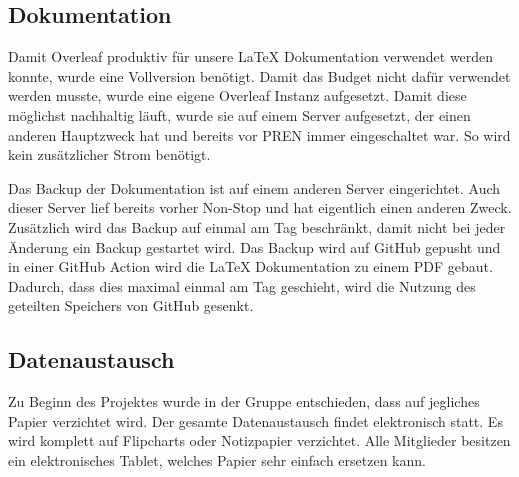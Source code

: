 

\subsection{Dokumentation}

Damit Overleaf produktiv für unsere LaTeX Dokumentation verwendet werden konnte, wurde eine Vollversion benötigt. Damit das Budget nicht dafür verwendet werden musste, wurde eine eigene Overleaf Instanz aufgesetzt. Damit diese möglichst nachhaltig läuft, wurde sie auf einem Server aufgesetzt, der einen anderen Hauptzweck hat und bereits vor PREN immer eingeschaltet war. So wird kein zusätzlicher Strom benötigt.

Das Backup der Dokumentation ist auf einem anderen Server eingerichtet. Auch dieser Server lief bereits vorher Non-Stop und hat eigentlich einen anderen Zweck. Zusätzlich wird das Backup auf einmal am Tag beschränkt, damit nicht bei jeder Änderung ein Backup gestartet wird. Das Backup wird auf GitHub gepusht und in einer GitHub Action wird die LaTeX Dokumentation zu einem PDF gebaut. Dadurch, dass dies maximal einmal am Tag geschieht, wird die Nutzung des geteilten Speichers von GitHub gesenkt.

\subsection{Datenaustausch}

Zu Beginn des Projektes wurde in der Gruppe entschieden, dass auf jegliches Papier verzichtet wird. Der gesamte Datenaustausch findet elektronisch statt. Es wird komplett auf Flipcharts oder Notizpapier verzichtet. Alle Mitglieder besitzen ein elektronisches Tablet, welches Papier sehr einfach ersetzen kann.